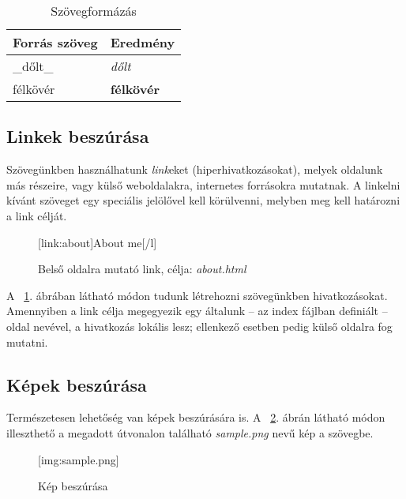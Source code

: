 \documentclass[a4paper,10pt]{article}
\begin{document}
\begin{table}[h!]
  \begin{center}
    \begin{tabular}{| l | l |}
    \hline
    Forrás szöveg & Eredmény \\
    \hline \hline
    \_dőlt\_ & \textit{dőlt} \\
    \hline
    \*félkövér\* & \textbf{félkövér} \\
    \hline
    \end{tabular}
  \end{center}
  \caption{Szövegformázás}
  \label{table:textformat}
\end{table}

\subsection{Linkek beszúrása}
Szövegünkben használhatunk \emph{link}eket (hiperhivatkozásokat), melyek oldalunk más részeire, vagy külső weboldalakra, internetes forrásokra mutatnak. A linkelni kívánt szöveget egy speciális jelölővel kell körülvenni, melyben meg kell határozni a link célját.

\begin{figure}[h]
	\begin{center}
		[link:about]About me[/l]
		\caption{Belső oldalra mutató link, célja: \emph{about.html}}
		\label{fig:loclink}
	\end{center}
\end{figure}

A ~\ref{fig:loclink}. ábrában látható módon tudunk létrehozni szövegünkben hivatkozásokat. Amennyiben a link célja megegyezik egy általunk -- az index fájlban definiált -- oldal nevével, a hivatkozás lokális lesz; ellenkező esetben pedig külső oldalra fog mutatni.

\subsection{Képek beszúrása}
Természetesen lehetőség van képek beszúrására is. A ~\ref{fig:insimg}. ábrán látható módon illeszthető a megadott útvonalon található \emph{sample.png} nevű kép a szövegbe.

\begin{figure}[h]
	\begin{center}
		[img:sample.png]
		\caption{Kép beszúrása}
		\label{fig:insimg}
	\end{center}
\end{figure}
\end{document}
